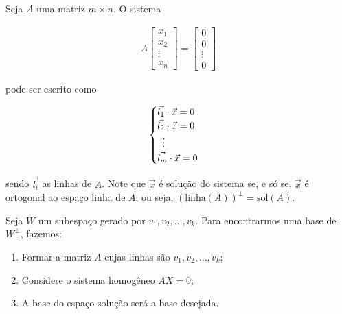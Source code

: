 \documentclass{article}
\begin{document}
\par\vspace{0.3cm} Seja $A$ uma matriz $m\times n$. O sistema 

\begin{align*}
A\begin{bmatrix}
x_1\\
x_2\\
\vdots\\
x_n
\end{bmatrix} = \begin{bmatrix}
0\\
0\\
\vdots\\
0
\end{bmatrix}
\end{align*}

\par\vspace{0.3cm} pode ser escrito como 

\begin{align*}
\begin{cases}
\vec{l_1}\cdot\vec{x} = 0 \\
\vec{l_2}\cdot\vec{x} = 0 \\
\vdotswithin{=} \\
\vec{l_m}\cdot\vec{x} = 0
\end{cases}
\end{align*}

\par\vspace{0.3cm} sendo $\vec{l_i}$ as linhas de $A$. Note que $\vec{x}$ é solução do sistema se, e só se, $\vec{x}$ é ortogonal ao espaço linha de $A$, ou seja, $(\text{linha}(A))^{\perp} = \text{sol}(A)$.

\par\vspace{0.3cm} Seja $W$ um subespaço gerado por $v_1, v_2, \dots, v_k$. Para encontrarmos uma base de $W^{\perp}$, fazemos:

\begin{enumerate}
	\item Formar a matriz $A$ cujas linhas são $v_1, v_2, \dots, v_k$;
	\item Considere o sistema homogêneo $AX = 0$;
	\item A base do espaço-solução será a base desejada.
\end{enumerate}
\end{document}
